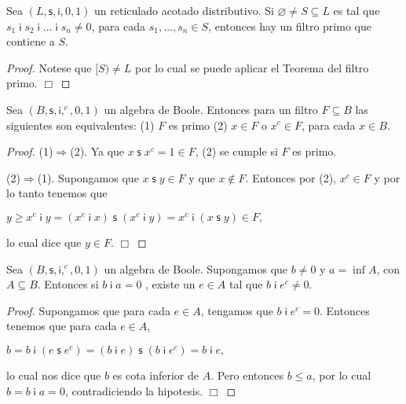   \begin{corollary}
    Sea \((L,\mathsf{s},\mathsf{i},0,1)\) un reticulado acotado distributivo. Si \( \varnothing \neq S\subseteq L\) es tal que \(s_{1}\;\mathsf{i\;}s_{2}\;\mathsf{ i\;}...\;\mathsf{i\;}s_{n}\neq 0\), para cada \(s_{1},...,s_{n}\in S\), entonces hay un filtro primo que contiene a \(S\).
  \end{corollary}
  \begin{proof}
    Notese que \([S)\neq L\) por lo cual se puede aplicar el Teorema del filtro primo. \(\Box\)
  \end{proof}

  \begin{lemma}
    Sea \((B,\mathsf{s},\mathsf{i},^{c},0,1)\) un algebra de Boole. Entonces para un filtro \(F\subseteq B\) las siguientes son equivalentes:
    (1) \(F\) es primo
    (2) \(x\in F\) o \(x^{c}\in F\), para cada \(x\in B\).
  \end{lemma}
  \begin{proof}
    (1)\(\Rightarrow \)(2). Ya que \(x\;\mathsf{s\;}x^{c}=1\in F\), (2) se cumple si \(F\) es primo.

    (2)\(\Rightarrow \)(1). Supongamos que \(x\;\mathsf{s\;}y\in F\) y que \(x\not\in F\). Entonces por (2), \(x^{c}\in F\) y por lo tanto tenemos que

    \(\displaystyle y\geq x^{c}\;\mathsf{i\;}y=(x^{c}\;\mathsf{i\;}x)\;\mathsf{s\;}(x^{c}\; \mathsf{i\;}y)=x^{c}\;\mathsf{i\;}(x\;\mathsf{s\;}y)\in F, \)

    lo cual dice que \(y\in F\). \(\Box\)
  \end{proof}

  \begin{lemma}
    Sea \((B,\mathsf{s},\mathsf{i},^{c},0,1)\) un algebra de Boole. Supongamos que \(b\neq 0\) y \(a=\inf A\), con \(A\subseteq B\). Entonces si \(b\;\mathsf{i\;}a=0\) , existe un \(e\in A\) tal que \(b\;\mathsf{i\;}e^{c}\neq 0\).
  \end{lemma}
  \begin{proof}
    Supongamos que para cada \(e\in A\), tengamos que \(b\;\mathsf{i\;}e^{c}=0\). Entonces tenemos que para cada \(e\in A\),

    \(\displaystyle b=b\;\mathsf{i\;}(e\;\mathsf{s\;}e^{c})=(b\;\mathsf{i\;}e)\;\mathsf{s\;}(b\; \mathsf{i\;}e^{c})=b\;\mathsf{i\;}e, \)

    lo cual nos dice que \(b\) es cota inferior de \(A\). Pero entonces \(b\leq a\), por lo cual \(b=b\;\mathsf{i\;}a=0\), contradiciendo la hipotesis. \(\Box\)
  \end{proof}

